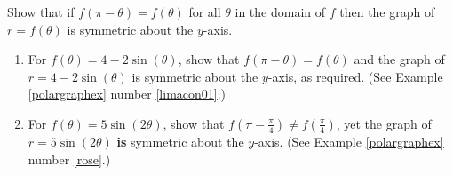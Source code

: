 \documentclass{ximera}
\begin{document}
\begin{question}
\begin{problem}
\begin{enumerate}
\end{enumerate}

\end{problem}

\begin{problem}
Show that if $ f(\pi-\theta)=f(\theta)$ for all $\theta$ in the domain of $f$ then the graph of $r = f(\theta)$ is symmetric about the $y$-axis. \label{sympolarlast}

\begin{enumerate}

\item  For $f(\theta) = 4-2\sin(\theta)$, show that $f(\pi - \theta) = f(\theta)$ and the graph of $r = 4-2\sin(\theta)$ is symmetric about the $y$-axis, as required.  (See Example \ref{polargraphex} number \ref{limacon01}.)

\item  For $f(\theta) = 5\sin(2\theta)$, show that $f\left(\pi - \frac{\pi}{4} \right) \neq  f\left(  \frac{\pi}{4} \right)$,  yet the graph of $r = 5\sin(2\theta)$ \textbf{is} symmetric about the $y$-axis.  (See  Example \ref{polargraphex} number  \ref{rose}.)

\end{enumerate}

\end{problem}

\end{question}
\end{document}
